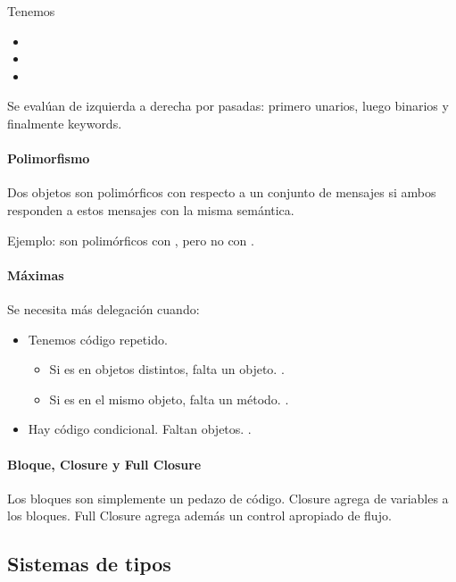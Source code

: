 Tenemos
\begin{itemize}
  \item {}
  \item {}
  \item {}
\end{itemize}

Se evalúan de izquierda a derecha por pasadas: primero unarios, luego binarios y finalmente keywords.

\paragraph{Polimorfismo}

Dos objetos son polimórficos con respecto a un conjunto de mensajes si ambos responden a estos mensajes con la misma semántica.

Ejemplo:  son polimórficos con , pero no con .

\paragraph{Máximas}

Se necesita más delegación cuando:
\begin{itemize}
  \item Tenemos código repetido.
    \begin{itemize}
      \item Si es en objetos distintos, falta un objeto. .
      \item Si es en el mismo objeto, falta un método. .
    \end{itemize}
  \item Hay código condicional. Faltan objetos. .
\end{itemize}

\paragraph{Bloque, Closure y Full Closure}

Los bloques son simplemente un pedazo de código. Closure agrega  de variables a los bloques. Full Closure agrega además un control apropiado de flujo.

\subsection{Sistemas de tipos}

